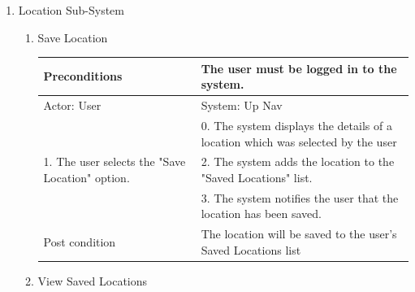\documentclass{article}
\begin{document}
\begin{center}
\begin{enumerate}
\begin{enumerate}
\begin{table}[]
\begin{tabular}{ | m{15em} | m{15em}| }
		\end{tabular}
	\end{table}
	\end{enumerate}

\item{Location Sub-System}

	\begin{enumerate}

	\item{Save Location}

	\begin{table}[]
	\centering
		\begin{tabular}{ | m{15em} | m{15em}| }
		\hline
		Preconditions                                    										& The user must be logged in to the system.  \\ 
		\hline
		Actor: User                                     										& System: Up Nav                                                                  \\ 
		\hline
                                               													& 0. The system displays the details of a location which was selected by the user \\
		\hline
		1. The user selects the "Save Location" option. 								& 2. The system adds the location to the "Saved Locations" list. \\
		\hline
                                                													& 3. The system notifies the user that the location has been saved. \\
		\hline
		Post condition                                   										& The location will be saved to the user's Saved Locations list \\
		\hline
		\end{tabular}
	\end{table}

	\item{View Saved Locations}


\end{enumerate}
\end{enumerate}
\end{center}
\end{document}
